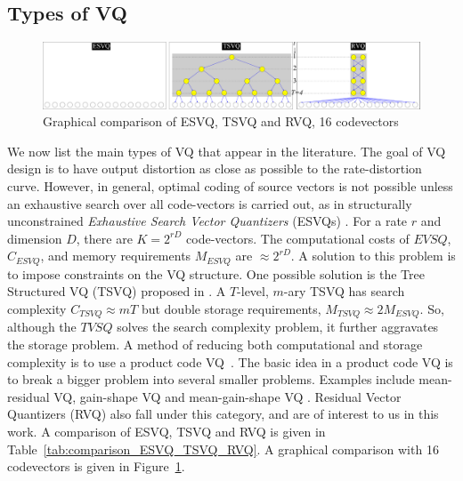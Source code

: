\begin{Body}
\section{Types of VQ}
\label{sec:types_VQ}

								\begin{figure}[htp]				
								\includegraphics[width=1.1\textwidth]{thesis/RVQ_comparisonWithESVQ_TSVQ.pdf}
								\caption{Graphical comparison of ESVQ, TSVQ and RVQ, 16 codevectors}
								\label{fig:comparison_ESVQ_TSVQ_RVQ}
								\end{figure}


We now list the main types of VQ that appear in the literature.  The goal of VQ design is to have output distortion as close as possible to the rate-distortion curve.  However, in general, optimal coding of source vectors is not possible unless an exhaustive search over all code-vectors is carried out, as in structurally unconstrained \emph{Exhaustive Search Vector Quantizers} (ESVQs) \cite{1992_JNL_RVQ_Barnes}.  For a rate $r$ and dimension $D$, there are $K=2^{rD}$ code-vectors.  The computational costs of $EVSQ$, $C_{ESVQ}$, and memory requirements $M_{ESVQ}$ are $\approx 2^{rD}$.  A solution to this problem is to impose constraints on the VQ structure.  One possible solution is the Tree Structured VQ (TSVQ) proposed in \cite{1980_JNL_TSVQ_Buzo}.  A $T$-level, $m$-ary TSVQ has search complexity $C_{TSVQ} \approx mT$ but double storage requirements, $M_{TSVQ} \approx 2 M_{ESVQ}$.   So, although the $TVSQ$ solves the search complexity problem, it further aggravates the storage problem.  A method of reducing both computational and storage complexity is to use a product code VQ~\cite{1991_BOOK_VQ_GershoGray}.  The basic idea in a product code VQ is to break a bigger problem into several smaller problems.  Examples include mean-residual VQ, gain-shape VQ and mean-gain-shape VQ \cite{1996_JNL_AdvancesRVQ_Barnes}.  Residual Vector Quantizers (RVQ) also fall under this category, and are of interest to us in this work.  A comparison of ESVQ, TSVQ and RVQ is given in Table~\ref{tab:comparison_ESVQ_TSVQ_RVQ}.  A graphical comparison with 16 codevectors is given in Figure~\ref{fig:comparison_ESVQ_TSVQ_RVQ}.


\end{Body}
